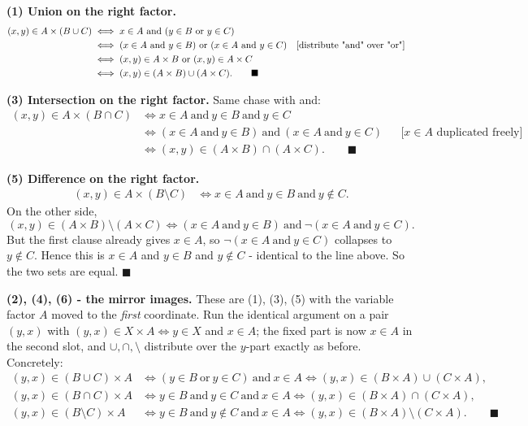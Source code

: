 \documentclass[11pt,a4paper]{article}
\begin{document}
\textbf{(1) Union on the right factor.}
\begin{align*}
(x,y)\in A\times(B\cup C)
&\iff x\in A\ \text{and}\ (y\in B\ \text{or}\ y\in C)\\
&\iff (x\in A\ \text{and}\ y\in B)\ \text{or}\ (x\in A\ \text{and}\ y\in C)
   &&\text{[distribute \textquotedbl{}and\textquotedbl{} over \textquotedbl{}or\textquotedbl{}]}\\
&\iff (x,y)\in A\times B\ \text{or}\ (x,y)\in A\times C\\
&\iff (x,y)\in(A\times B)\cup(A\times C). \qquad\blacksquare
\end{align*}

\textbf{(3) Intersection on the right factor.} Same chase with \textquotedbl{}and\textquotedbl{}:
\begin{align*}
(x,y)\in A\times(B\cap C)
&\iff x\in A\ \text{and}\ y\in B\ \text{and}\ y\in C\\
&\iff (x\in A\ \text{and}\ y\in B)\ \text{and}\ (x\in A\ \text{and}\ y\in C)
   &&\text{[$x\in A$ duplicated freely]}\\
&\iff (x,y)\in(A\times B)\cap(A\times C). \qquad\blacksquare
\end{align*}

\textbf{(5) Difference on the right factor.}
\begin{align*}
(x,y)\in A\times(B\setminus C)
&\iff x\in A\ \text{and}\ y\in B\ \text{and}\ y\notin C.
\end{align*}
On the other side,
$$(x,y)\in(A\times B)\setminus(A\times C)\iff (x\in A\ \text{and}\ y\in B)\ \text{and}\ \neg(x\in A\ \text{and}\ y\in C).$$
But the first clause already gives $x\in A$, so $\neg(x\in A\ \text{and}\ y\in C)$ collapses to
$y\notin C$. Hence this is $x\in A$ and $y\in B$ and $y\notin C$ - identical to the line above. So
the two sets are equal. $\blacksquare$

\textbf{(2), (4), (6) - the mirror images.}
These are (1), (3), (5) with the variable factor $A$ moved to the \emph{first} coordinate. Run the
identical argument on a pair $(y,x)$ with $(y,x)\in X\times A\iff y\in X$ and $x\in A$; the fixed
part is now $x\in A$ in the second slot, and $\cup,\cap,\setminus$ distribute over the $y$-part
exactly as before. Concretely:
\begin{align*}
(y,x)\in(B\cup C)\times A &\iff (y\in B\ \text{or}\ y\in C)\ \text{and}\ x\in A
  \iff (y,x)\in(B\times A)\cup(C\times A),\\
(y,x)\in(B\cap C)\times A &\iff y\in B\ \text{and}\ y\in C\ \text{and}\ x\in A
  \iff (y,x)\in(B\times A)\cap(C\times A),\\
(y,x)\in(B\setminus C)\times A &\iff y\in B\ \text{and}\ y\notin C\ \text{and}\ x\in A
  \iff (y,x)\in(B\times A)\setminus(C\times A).\qquad\blacksquare
\end{align*}
\end{document}
